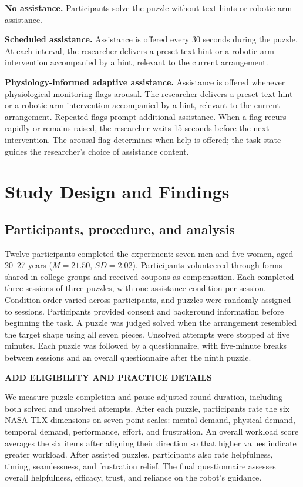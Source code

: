 \documentclass[sigconf,anonymous]{aamas}
\begin{document}
\textbf{No assistance.} Participants solve the puzzle without text hints or robotic-arm assistance.

\textbf{Scheduled assistance.} Assistance is offered every 30 seconds during the puzzle. At each interval, the researcher delivers a preset text hint or a robotic-arm intervention accompanied by a hint, relevant to the current arrangement.

\textbf{Physiology-informed adaptive assistance.} Assistance is offered whenever physiological monitoring flags arousal. The researcher delivers a preset text hint or a robotic-arm intervention accompanied by a hint, relevant to the current arrangement. Repeated flags prompt additional assistance. When a flag recurs rapidly or remains raised, the researcher waits 15 seconds before the next intervention. The arousal flag determines when help is offered; the task state guides the researcher’s choice of assistance content.

\section{Study Design and Findings}

\subsection{Participants, procedure, and analysis}

Twelve participants completed the experiment: seven men and five women, aged 20--27 years ($M=21.50$, $SD=2.02$). Participants volunteered through forms shared in college groups and received coupons as compensation. Each completed three sessions of three puzzles, with one assistance condition per session. Condition order varied across participants, and puzzles were randomly assigned to sessions. Participants provided consent and background information before beginning the task. A puzzle was judged solved when the arrangement resembled the target shape using all seven pieces. Unsolved attempts were stopped at five minutes. Each puzzle was followed by a questionnaire, with five-minute breaks between sessions and an overall questionnaire after the ninth puzzle.

\textbf{ADD ELIGIBILITY AND PRACTICE DETAILS}

We measure puzzle completion and pause-adjusted round duration, including both solved and unsolved attempts. After each puzzle, participants rate the six NASA-TLX dimensions on seven-point scales: mental demand, physical demand, temporal demand, performance, effort, and frustration. An overall workload score averages the six items after aligning their direction so that higher values indicate greater workload. After assisted puzzles, participants also rate helpfulness, timing, seamlessness, and frustration relief. The final questionnaire assesses overall helpfulness, efficacy, trust, and reliance on the robot's guidance.
\end{document}
